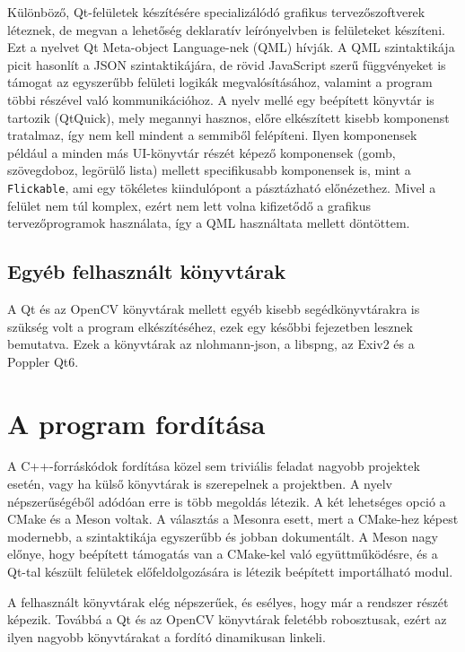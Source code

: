 Különböző, Qt-felületek készítésére specializálódó grafikus tervezőszoftverek léteznek, de megvan a lehetőség deklaratív leírónyelvben is felületeket készíteni. Ezt a nyelvet Qt Meta-object Language-nek (QML) hívják. A QML szintaktikája picit hasonlít a JSON szintaktikájára, de rövid JavaScript szerű függvényeket is támogat az egyszerűbb felületi logikák megvalósításához, valamint a program többi részével való kommunikációhoz. A nyelv mellé egy beépített könyvtár is tartozik (QtQuick), mely megannyi hasznos, előre elkészített kisebb komponenst tratalmaz, így nem kell mindent a semmiből felépíteni. Ilyen komponensek például a minden más UI-könyvtár részét képező komponensek (gomb, szövegdoboz, legörülő lista) mellett specifikusabb komponensek is, mint a \texttt{Flickable}, ami egy tökéletes kiindulópont a pásztázható előnézethez.
Mivel a felület nem túl komplex, ezért nem lett volna kifizetődő a grafikus tervezőprogramok használata, így a QML használtata mellett döntöttem.

\subsection{Egyéb felhasznált könyvtárak}

A Qt és az OpenCV könyvtárak mellett egyéb kisebb segédkönyvtárakra is szükség volt a program elkészítéséhez, ezek egy későbbi fejezetben lesznek bemutatva. Ezek a könyvtárak az nlohmann-json, a libspng, az Exiv2 és a Poppler Qt6.

\section{A program fordítása}

A C++-forráskódok fordítása közel sem triviális feladat nagyobb projektek esetén, vagy ha külső könyvtárak is szerepelnek a projektben. A nyelv népszerűségéből adódóan erre is több megoldás létezik. A két lehetséges opció a CMake és a Meson voltak. A választás a Mesonra esett, mert a CMake-hez képest modernebb, a szintaktikája egyszerűbb és jobban dokumentált. A Meson nagy előnye, hogy beépített támogatás van a CMake-kel való együttműködésre, és a Qt-tal készült felületek előfeldolgozására is létezik beépített importálható modul.

A felhasznált könyvtárak elég népszerűek, és esélyes, hogy már a rendszer részét képezik. Továbbá a Qt és az OpenCV könyvtárak feletébb robosztusak, ezért az ilyen nagyobb könyvtárakat a fordító dinamikusan linkeli.

